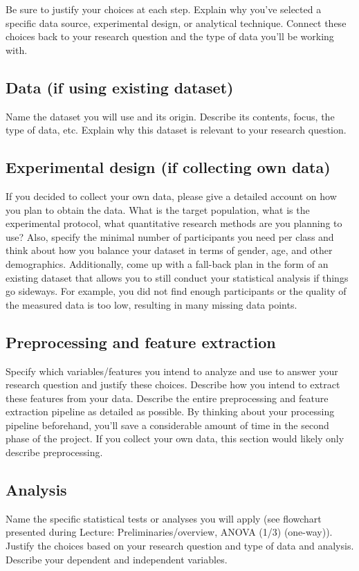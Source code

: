 \documentclass[10pt,a4paper]{article}
\begin{document}
Be sure to justify your choices at each step. Explain why you've selected a specific data source, experimental design, or analytical technique. Connect these choices back to your research question and the type of data you'll be working with.

\subsection{Data (if using existing dataset)}
Name the dataset you will use and its origin. Describe its contents, focus, the type of data, etc. Explain why this dataset is relevant to your research question. 

\subsection{Experimental design (if collecting own data)}
If you decided to collect your own data, please give a detailed account on how you plan to obtain the data. What is the target population, what is the experimental protocol, what quantitative research methods are you planning to use? Also, specify the minimal number of participants you need per class and think about how you balance your dataset in terms of gender, age, and other demographics. Additionally, come up with a fall-back plan in the form of an existing dataset that allows you to still conduct your statistical analysis if things go sideways. For example, you did not find enough participants or the quality of the measured data is too low, resulting in many missing data points. 

\subsection{Preprocessing and feature extraction}
Specify which variables/features you intend to analyze and use to answer your research question and justify these choices. Describe how you intend to extract these features from your data. Describe the entire preprocessing and feature extraction pipeline as detailed as possible. By thinking about your processing pipeline beforehand, you'll save a considerable amount of time in the second phase of the project.
If you collect your own data, this section would likely only describe preprocessing.

\subsection{Analysis}
Name the specific statistical tests or analyses you will apply (see flowchart presented during Lecture: Preliminaries/overview, ANOVA (1/3) (one-way)). Justify the choices based on your research question and type of data and analysis. Describe your dependent and independent variables. 
\end{document}
